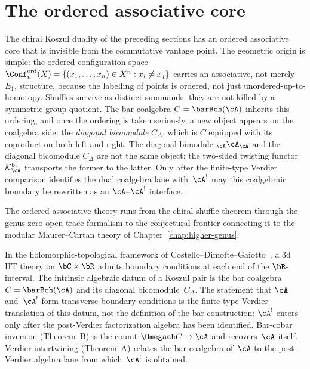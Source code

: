 
\section{The ordered associative core}
\label{sec:ordered-associative-core}

The chiral Koszul duality of the preceding sections has an ordered
associative core that is invisible from the commutative vantage point.
The geometric origin is simple: the ordered configuration space
$\Conf_n^{\mathrm{ord}}(X) = \{(x_1, \ldots, x_n) \in X^n :
x_i \neq x_j\}$ carries an associative, not merely $E_1$, structure,
because the labelling of points is ordered, not just
unordered-up-to-homotopy. Shuffles survive as distinct summands; they
are not killed by a symmetric-group quotient. The bar coalgebra
$C = \barBch(\cA)$ inherits this ordering, and once the ordering is
taken seriously, a new object appears on the coalgebra side: the
\emph{diagonal bicomodule} $C_\Delta$, which is $C$ equipped with its
coproduct on both left and right. The diagonal bimodule
${}_\cA\cA_\cA$ and the diagonal bicomodule $C_\Delta$ are not the
same object; the two-sided twisting functor
$\mathcal K_\cA^{\mathrm{bi}}$ transports the former to the latter.
Only after the finite-type Verdier comparison identifies the dual
coalgebra lane with~$\cA^!$ may this coalgebraic boundary be rewritten
as an $\cA$--$\cA^!$ interface.

The ordered associative
theory runs from the chiral shuffle theorem through the genus-zero open
trace formalism to the conjectural frontier connecting
it to the modular Maurer--Cartan theory of
Chapter~\ref{chap:higher-genus}.

\begin{remark}
\label{rem:dimofte-transverse-boundary}
%
%
%
In the holomorphic-topological framework of
Costello--Dimofte--Gaiotto~\cite{CDG2024,CG17}, a
$3$d HT theory on $\bC \times \bR$ admits boundary conditions
at each end of the $\bR$-interval. The intrinsic algebraic datum of a
Koszul pair is the bar coalgebra $C=\barBch(\cA)$ and its diagonal
bicomodule~$C_\Delta$.  The statement that $\cA$ and~$\cA^!$ form
transverse boundary conditions is the finite-type Verdier
translation of this datum, not the definition of the bar construction:
$\cA^!$ enters only after the post-Verdier factorization algebra has
been identified. Bar-cobar
inversion (Theorem~B) is the counit
$\Omegach C\to\cA$ and recovers~$\cA$ itself.  Verdier intertwining
(Theorem~A) relates the bar coalgebra of~$\cA$ to the
post-Verdier algebra lane from which~$\cA^!$ is obtained.
\end{remark}

